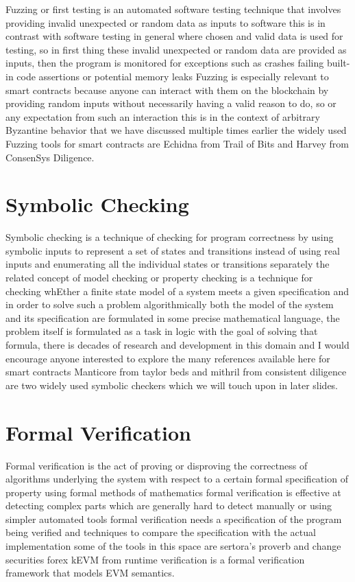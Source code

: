 Fuzzing or first testing is an automated software testing technique that involves providing invalid unexpected or random data as inputs to software this is in contrast with software testing in general where chosen and valid data is used for testing, so in first thing these invalid unexpected or random data are provided as inputs, then the program is monitored for exceptions such as crashes failing built-in code assertions or potential memory leaks Fuzzing is especially relevant to smart contracts because anyone can interact with them on the blockchain by providing random inputs without necessarily having a valid reason to do, so or any expectation from such an interaction this is in the context of arbitrary Byzantine behavior that we have discussed multiple times earlier the widely used Fuzzing tools for smart contracts are Echidna from Trail of Bits and Harvey from ConsenSys Diligence.

\section{Symbolic Checking}

Symbolic checking is a technique of checking for program correctness by using symbolic inputs to represent a set of states and transitions instead of using real inputs and enumerating all the individual states or transitions separately the related concept of model checking or property checking is a technique for checking whEther a finite state model of a system meets a given specification and in order to solve such a problem algorithmically both the model of the system and its specification are formulated in some precise mathematical language, the problem itself is formulated as a task in logic with the goal of solving that formula, there is decades of research and development in this domain and I would encourage anyone interested to explore the many references available here for smart contracts Manticore from taylor beds and mithril from consistent diligence are two widely used symbolic checkers which we will touch upon in later slides.

\section{Formal Verification}

Formal verification is the act of proving or disproving the correctness of algorithms underlying the system with respect to a certain formal specification of property using formal methods of mathematics formal verification is effective at detecting complex parts which are generally hard to detect manually or using simpler automated tools formal verification needs a specification of the program being verified and techniques to compare the specification with the actual implementation some of the tools in this space are sertora's proverb and change securities forex kEVM from runtime verification is a formal verification framework that models EVM semantics.

